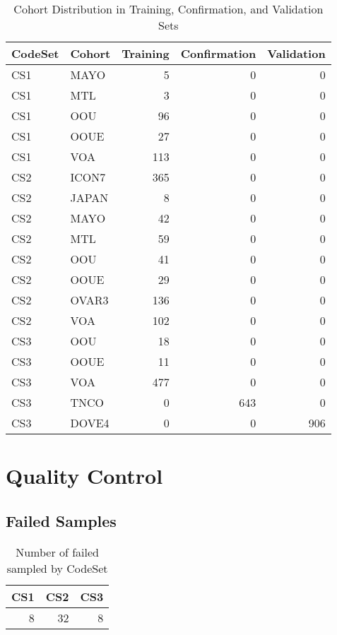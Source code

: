 \documentclass[
]{report}
\begin{document}
\begin{table}

\caption{\label{tab:cohort-dist}Cohort Distribution in Training, Confirmation, and Validation Sets}
\centering
\begin{tabular}[t]{l|l|r|r|r}
\hline
CodeSet & Cohort & Training & Confirmation & Validation\\
\hline
CS1 & MAYO & 5 & 0 & 0\\
\hline
CS1 & MTL & 3 & 0 & 0\\
\hline
CS1 & OOU & 96 & 0 & 0\\
\hline
CS1 & OOUE & 27 & 0 & 0\\
\hline
CS1 & VOA & 113 & 0 & 0\\
\hline
CS2 & ICON7 & 365 & 0 & 0\\
\hline
CS2 & JAPAN & 8 & 0 & 0\\
\hline
CS2 & MAYO & 42 & 0 & 0\\
\hline
CS2 & MTL & 59 & 0 & 0\\
\hline
CS2 & OOU & 41 & 0 & 0\\
\hline
CS2 & OOUE & 29 & 0 & 0\\
\hline
CS2 & OVAR3 & 136 & 0 & 0\\
\hline
CS2 & VOA & 102 & 0 & 0\\
\hline
CS3 & OOU & 18 & 0 & 0\\
\hline
CS3 & OOUE & 11 & 0 & 0\\
\hline
CS3 & VOA & 477 & 0 & 0\\
\hline
CS3 & TNCO & 0 & 643 & 0\\
\hline
CS3 & DOVE4 & 0 & 0 & 906\\
\hline
\end{tabular}
\end{table}

\hypertarget{quality-control}{%
\section{Quality Control}\label{quality-control}}

\hypertarget{failed-samples}{%
\subsection{Failed Samples}\label{failed-samples}}

\begin{table}

\caption{\label{tab:qc-failed}Number of failed sampled by CodeSet}
\centering
\begin{tabular}[t]{r|r|r}
\hline
CS1 & CS2 & CS3\\
\hline
8 & 32 & 8\\
\hline
\end{tabular}
\end{table}
\end{document}
